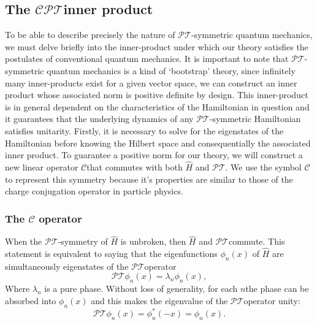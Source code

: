 \documentclass[12pt, a4paper]{report}
\newcommand\PT{\(\mathcal{PT}\)}
\newcommand\CC{\(\mathcal{C}\)}
\begin{document}
\subsection{The \texorpdfstring{$\mathcal{CPT}$}\:\:inner product}\label{CPT}
To be able to describe precisely the nature of \PT-symmetric quantum mechanics, we must delve briefly into the inner-product under which our theory satisfies the postulates of conventional quantum mechanics. It is important to note that \PT-symmetric quantum mechanics is a kind of `bootstrap' theory\cite{MakingSense}, since infinitely many inner-products exist for a given vector space, we can construct an inner product whose associated norm is positive definite by design. This inner-product is in general dependent on the characteristics of the Hamiltonian in question and it guarantees that the underlying dynamics of any \PT-symmetric Hamiltonian satisfies unitarity\cite{MustaHbeHermitian}.
Firstly, it is necessary to solve for the eigenstates of the Hamiltonian before knowing the Hilbert space and consequentially the associated inner product.
To guarantee a positive norm for our theory, we will construct a new linear operator \CC\:that commutes with both $\hat{H}$ and \PT. We use the symbol \CC\: to represent this symmetry because it's properties are similar to those of the charge conjugation operator in particle physics\cite{MakingSense}.

\subsubsection{The $\mathcal{C}$ operator}\label{CC}
When the \PT-symmetry of $\hat{H}$ is unbroken, then $\hat{H}$ and \PT\:commute. This statement is equivalent to saying that the eigenfunctions $\phi_n(x)$ of $\hat{H}$ are simultaneously eigenstates of the \PT\:operator\cite{Bender_2004}
\begin{equation}\label{eq:3}
\mathcal{PT}\phi_n(x) = \lambda_n \phi_n(x),
\end{equation}
Where $\lambda_n$ is a pure phase. Without loss of generality, for each $n$\:the phase can be absorbed into $\phi_n(x)$ and this makes the eigenvalue of the \PT operator unity\cite{Bender_2004}: 
\begin{equation}\label{eq:4}
\mathcal{PT}\phi_n(x) = \phi_{n}^{*}(-x) = \phi_n(x).
\end{equation}
\end{document}
